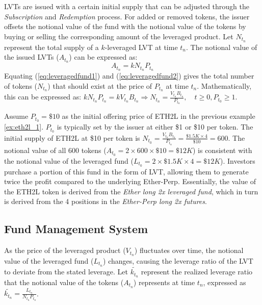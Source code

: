 LVTs are issued with a certain initial supply that can be adjusted through the \textsl{Subscription} and \textsl{Redemption} process. For added or removed tokens, the issuer offsets the notional value of the fund with the notional value of the tokens by buying or selling the corresponding amount of the leveraged product. Let $N_{t_{n}}$ represent the total supply of a $k$-leveraged LVT at time $t_{n}$. The notional value of the issued LVTs ($A_{t_{n}}$) can be expressed as:
\begin{equation}\label{eq:leveragedfund2}
	A_{t_{n}}=kN_{t_{n}}P_{t_{n}}
\end{equation}
Equating (\ref{eq:leveragedfund1}) and (\ref{eq:leveragedfund2}) gives the total number of tokens ($N_{t_{n}}$) that should exist at the price of $P_{t_{n}}$ at time $t_{n}$. Mathematically, this can be expressed as: $kN_{t_{n}}P_{t_{n}}=kV_{t_{n}}B_{t_{n}} \Rightarrow  N_{t_{n}}=\frac{V_{t_{n}}B_{t_{n}}}{P_{t_{n}}},\quad t \ge 0, P_{t_{0}} \ge 1$.

\begin{example}\label{ex:eth2l_2}
	Assume $P_{t_{0}}=\$10$ as the initial offering price of ETH2L in the previous example \ref{ex:eth2l_1}. $P_{t_{0}}$ is typically set by the issuer at either \$1 or \$10 per token. The initial supply of ETH2L at \$10 per token is \(N_{t_{0}}=\frac{V_{t_{n}}B_{t_{n}}}{P_{t_{n}}}=\frac{\$1.5K\times{4}}{\$10}=600\). The notional value of all 600 tokens ($A_{t_{0}}=2\times{600}\times{\$10}=\$12K$) is consistent with the notional value of the leveraged fund ($L_{t_{0}}=2\times{\$1.5K}\times{4}=\$12K$). Investors purchase a portion of this fund in the form of LVT, allowing them to generate twice the profit compared to the underlying Ether-Perp. Essentially, the value of the ETH2L token is derived from the \textsl{Ether long 2x leveraged fund}, which in turn is derived from the 4 positions in the \textsl{Ether-Perp long 2x futures}.
\end{example}

\subsection{Fund Management System}\label{subsec:fundmgmt}
As the price of the leveraged product ($V_{t_{n}}$) fluctuates over time, the notional value of the leveraged fund ($L_{t_{n}}$) changes, causing the leverage ratio of the LVT to deviate from the stated leverage. Let $\tilde{k_{t_{n}}}$ represent the realized leverage ratio that the notional value of the tokens ($A_{t_{n}}$) represents at time $t_{n}$, expressed as $\tilde{k_{t_{n}}}=\frac{L_{t_{n}}}{N_{t_{n}}P_{t_{n}}}$.

